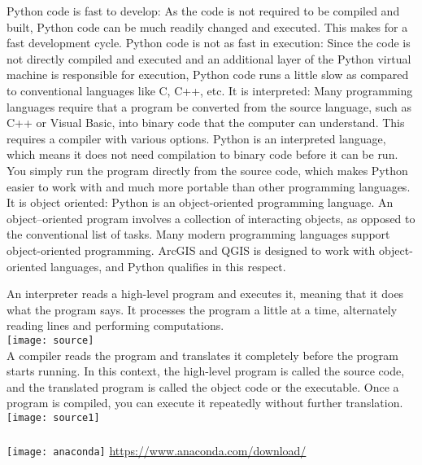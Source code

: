 \documentclass[12pt]{beamer}
\begin{document}
\begin{frame}
\scriptsize {
\alert{Python code is fast to develop}: As the code is not required to be compiled and built, Python code can be much readily changed and executed. This makes for a fast development cycle.\vfill
\alert{Python code is not as fast in execution}: Since the code is not directly compiled and executed and an additional layer of the Python virtual machine is responsible for execution, Python code runs a little slow as compared to conventional languages like C, C++, etc.\vfill
\alert{It is interpreted}: Many programming languages require that a program be converted from the source language, such as C++ or Visual Basic, into binary code that the computer can understand. This requires a compiler with various options. Python is an interpreted language, which means it does not need compilation to binary code before it can be run. You simply run the program directly from the source code, which makes Python easier to work with and much more portable than other programming languages.\vfill
\alert{It is object oriented}: Python is an object-oriented programming language. An object--oriented program involves a collection of interacting objects, as opposed to the conventional list of tasks. Many modern programming languages support object-oriented programming. ArcGIS and QGIS is designed to work with object-oriented languages, and Python qualifies in this respect.
}
\end{frame} 
\begin{frame}
\scriptsize{\alert{An interpreter} reads a high-level program and executes it, meaning that it does what the program says. It processes the program a little at a time, alternately reading lines and performing computations.}\\
\texttt{[image: source]}\\
\vfill
\scriptsize{\alert{A compiler} reads the program and translates it completely before the program starts running.
In this context, the high-level program is called the source code, and the translated program is called the object code or the executable. Once a program is compiled, you can execute it repeatedly without further translation.} 
\texttt{[image: source1]}
\end{frame} 
\begin{frame}
\frametitle{}
\centering
	\texttt{[image: anaconda]}
\vfill
\url{https://www.anaconda.com/download/}
\end{frame}
\end{document}
